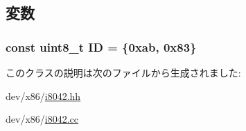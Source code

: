 \subsection{変数}
\hypertarget{classX86ISA_1_1PS2Keyboard_aad1dea7ff5c01171f72700e686ae867e}{
\subsubsection[{ID}]{\setlength{\rightskip}{0pt plus 5cm}const uint8\_\-t {\bf ID} = \{0xab, 0x83\}}}
\label{classX86ISA_1_1PS2Keyboard_aad1dea7ff5c01171f72700e686ae867e}


このクラスの説明は次のファイルから生成されました:\begin{DoxyCompactItemize}
\item 
dev/x86/\hyperlink{i8042_8hh}{i8042.hh}\item 
dev/x86/\hyperlink{i8042_8cc}{i8042.cc}\end{DoxyCompactItemize}
